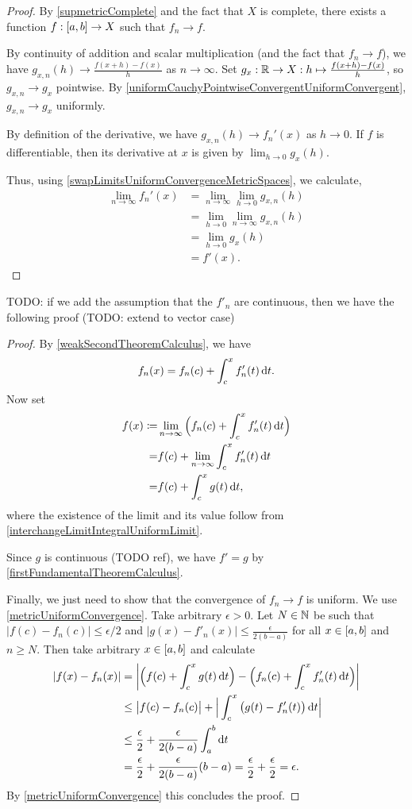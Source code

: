 \begin{proof}
By \ref{supmetricComplete} and the fact that $X$ is complete, there exists a function $f: \interval{a,b}\to X$ such that $f_n \to f$.

By continuity of addition and scalar multiplication (and the fact that $f_n\to f$), we have $g_{x,n}(h) \to \frac{f(x+h) - f(x)}{h}$ as $n\to \infty$. Set $g_{x}: \mathbb{R}\to X: h\mapsto \frac{f(x+h) - f(x)}{h}$, so $g_{x,n} \to g_x$ pointwise. By \ref{uniformCauchyPointwiseConvergentUniformConvergent}, $g_{x,n} \to g_x$ uniformly.

By definition of the derivative, we have $g_{x,n}(h) \to f_n'(x)$ as $h\to 0$. If $f$ is differentiable, then its derivative at $x$ is given by $\lim_{h\to 0}g_x(h)$.

Thus, using \ref{swapLimitsUniformConvergenceMetricSpaces}, we calculate,
\begin{align*}
\lim_{n\to \infty} f_n'(x) &= \lim_{n\to \infty} \lim_{h\to 0}g_{x,n}(h) \\
&= \lim_{h\to 0} \lim_{n\to \infty} g_{x,n}(h) \\
&= \lim_{h\to 0} g_{x}(h) \\
&= f'(x).
\end{align*}
\end{proof}
TODO: if we add the assumption that the $f'_n$ are continuous, then we have the following proof (TODO: extend to vector case)
\begin{proof}
By \ref{weakSecondTheoremCalculus}, we have
\[ f_n(x) = f_n(c) + \int_c^x f'_n(t)\operatorname{d \!}{t}. \]
Now set
\begin{align*}
f(x) \coloneqq& \lim_{n\to \infty} \Big(f_n(c) + \int_c^x f'_n(t)\operatorname{d \!}{t}\Big) \\
=& f(c) + \lim_{n\to \infty}\int_c^x f'_n(t)\operatorname{d \!}{t} \\
=& f(c) + \int_c^x g(t)\operatorname{d \!}{t},
\end{align*}
where the existence of the limit and its value follow from \ref{interchangeLimitIntegralUniformLimit}.

Since $g$ is continuous (TODO ref), we have $f' = g$ by \ref{firstFundamentalTheoremCalculus}.

Finally, we just need to show that the convergence of $f_n\to f$ is uniform. We use \ref{metricUniformConvergence}. Take arbitrary $\epsilon >0$. Let $N\in \mathbb{N}$ be such that $|f(c) - f_n(c)| \leq \epsilon / 2$ and $|g(x) - f'_n(x)| \leq \frac{\epsilon}{2(b-a)}$ for all $x\in \interval{a,b}$ and $n\geq N$. Then take arbitrary $x\in \interval{a,b}$ and calculate
\begin{align*}
|f(x) - f_n(x)| &= \bigg|\Big(f(c)+\int_c^x g(t) \operatorname{d \!}{t}\Big) - \Big(f_n(c)+\int_c^x f_n'(t) \operatorname{d \!}{t}\Big)\bigg| \\
&\leq \big|f(c) - f_n(c)\big| + \Big|\int_c^x \big(g(t)- f_n'(t)\big)\operatorname{d \!}{t}\Big| \\
&\leq \frac{\epsilon}{2} + \frac{\epsilon}{2(b-a)}\int_a^b\operatorname{d \!}{t} \\
&= \frac{\epsilon}{2} + \frac{\epsilon}{2(b-a)}(b-a) = \frac{\epsilon}{2} + \frac{\epsilon}{2} = \epsilon.
\end{align*}
By \ref{metricUniformConvergence} this concludes the proof. 
\end{proof}

